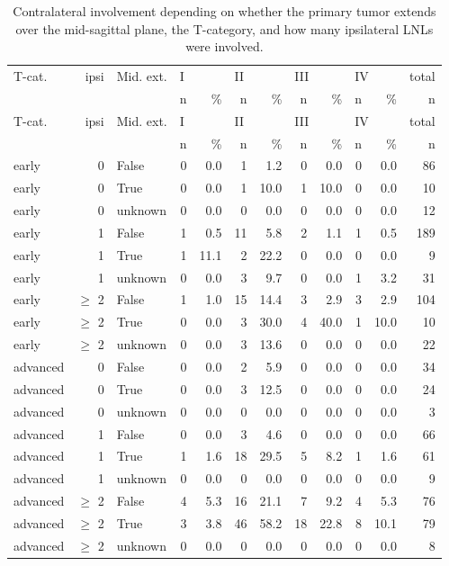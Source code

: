 \documentclass[
  sn-mathphys-num,
]{sn-jnl}
\begin{document}
\begin{longtable}[]{@{}lrlrrrrrrrrr@{}}

\caption{\label{tbl-data-strat}Contralateral involvement depending on
whether the primary tumor extends over the mid-sagittal plane, the
T-category, and how many ipsilateral LNLs were involved.}

\tabularnewline

\tabularnewline
\toprule\noalign{}
T-cat. & ipsi & Mid. ext. & \multicolumn{2}{l}{%
I} & \multicolumn{2}{l}{%
II} & \multicolumn{2}{l}{%
III} & \multicolumn{2}{l}{%
IV} & total \\
& & & n & \% & n & \% & n & \% & n & \% & n \\
\midrule\noalign{}
\endfirsthead
\toprule\noalign{}
T-cat. & ipsi & Mid. ext. & \multicolumn{2}{l}{%
I} & \multicolumn{2}{l}{%
II} & \multicolumn{2}{l}{%
III} & \multicolumn{2}{l}{%
IV} & total \\
& & & n & \% & n & \% & n & \% & n & \% & n \\
\midrule\noalign{}
\endhead
\bottomrule\noalign{}
\endlastfoot
early & 0 & False & 0 & 0.0 & 1 & 1.2 & 0 & 0.0 & 0 & 0.0 & 86 \\
early & 0 & True & 0 & 0.0 & 1 & 10.0 & 1 & 10.0 & 0 & 0.0 & 10 \\
early & 0 & unknown & 0 & 0.0 & 0 & 0.0 & 0 & 0.0 & 0 & 0.0 & 12 \\
early & 1 & False & 1 & 0.5 & 11 & 5.8 & 2 & 1.1 & 1 & 0.5 & 189 \\
early & 1 & True & 1 & 11.1 & 2 & 22.2 & 0 & 0.0 & 0 & 0.0 & 9 \\
early & 1 & unknown & 0 & 0.0 & 3 & 9.7 & 0 & 0.0 & 1 & 3.2 & 31 \\
early & $\geq$ 2 & False & 1 & 1.0 & 15 & 14.4 & 3 & 2.9 & 3 & 2.9 &
104 \\
early & $\geq$ 2 & True & 0 & 0.0 & 3 & 30.0 & 4 & 40.0 & 1 & 10.0 &
10 \\
early & $\geq$ 2 & unknown & 0 & 0.0 & 3 & 13.6 & 0 & 0.0 & 0 & 0.0 & 22 \\
advanced & 0 & False & 0 & 0.0 & 2 & 5.9 & 0 & 0.0 & 0 & 0.0 & 34 \\
advanced & 0 & True & 0 & 0.0 & 3 & 12.5 & 0 & 0.0 & 0 & 0.0 & 24 \\
advanced & 0 & unknown & 0 & 0.0 & 0 & 0.0 & 0 & 0.0 & 0 & 0.0 & 3 \\
advanced & 1 & False & 0 & 0.0 & 3 & 4.6 & 0 & 0.0 & 0 & 0.0 & 66 \\
advanced & 1 & True & 1 & 1.6 & 18 & 29.5 & 5 & 8.2 & 1 & 1.6 &
61 \\
advanced & 1 & unknown & 0 & 0.0 & 0 & 0.0 & 0 & 0.0 & 0 & 0.0 & 9 \\
advanced & $\geq$ 2 & False & 4 & 5.3 & 16 & 21.1 & 7 & 9.2 & 4 & 5.3 &
76 \\
advanced & $\geq$ 2 & True & 3 & 3.8 & 46 & 58.2 & 18 & 22.8 & 8 & 10.1 &
79 \\
advanced & $\geq$ 2 & unknown & 0 & 0.0 & 0 & 0.0 & 0 & 0.0 & 0 & 0.0 & 8 \\

\end{longtable}
\end{document}
